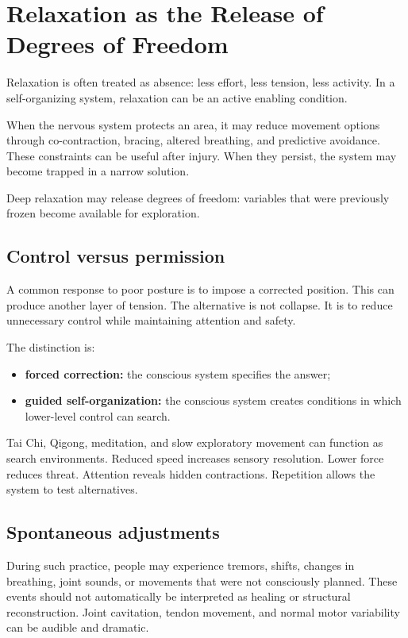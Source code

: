 \chapter{Relaxation as the Release of Degrees of Freedom}

Relaxation is often treated as absence: less effort, less tension, less activity. In a self-organizing system, relaxation can be an active enabling condition.

When the nervous system protects an area, it may reduce movement options through co-contraction, bracing, altered breathing, and predictive avoidance. These constraints can be useful after injury. When they persist, the system may become trapped in a narrow solution.

Deep relaxation may release degrees of freedom: variables that were previously frozen become available for exploration.

\section{Control versus permission}

A common response to poor posture is to impose a corrected position. This can produce another layer of tension. The alternative is not collapse. It is to reduce unnecessary control while maintaining attention and safety.

The distinction is:

\begin{itemize}
\tightlist
\item
  \textbf{forced correction:} the conscious system specifies the answer;
\item
  \textbf{guided self-organization:} the conscious system creates conditions in which lower-level control can search.
\end{itemize}

Tai Chi, Qigong, meditation, and slow exploratory movement can function as search environments. Reduced speed increases sensory resolution. Lower force reduces threat. Attention reveals hidden contractions. Repetition allows the system to test alternatives.

\section{Spontaneous adjustments}

During such practice, people may experience tremors, shifts, changes in breathing, joint sounds, or movements that were not consciously planned. These events should not automatically be interpreted as healing or structural reconstruction. Joint cavitation, tendon movement, and normal motor variability can be audible and dramatic.

